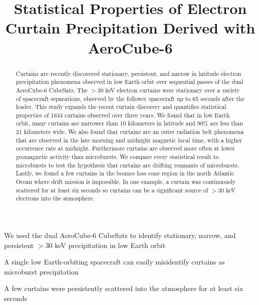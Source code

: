 \documentclass[draft]{agujournal2019}
\begin{document}
\title{Statistical Properties of Electron Curtain Precipitation Derived with AeroCube-6}

%
%






\begin{keypoints}
\item We used the dual AeroCube-6 CubeSats to identify stationary, narrow, and persistent $>30$ keV precipitation in low Earth orbit
\item A single low Earth-orbiting spacecraft can easily misidentify curtains as microburst precipitation
\item A few curtains were persistently scattered into the atmosphere for at least six seconds
\end{keypoints}


\begin{abstract}
Curtains are recently discovered stationary, persistent, and narrow in latitude electron precipitation phenomena observed in low Earth orbit over sequential passes of the dual AeroCube-6 CubeSats. The $> 30$ keV electron curtains were stationary over a variety of spacecraft separations, observed by the follower spacecraft up to 65 seconds after the leader. This study expands the recent curtain discovery and quantifies statistical properties of 1634 curtains observed over three years. We found that in low Earth orbit, many curtains are narrower than 10 kilometers in latitude and 90\% are less than 21 kilometers wide. We also found that curtains are an outer radiation belt phenomena that are observed in the late morning and midnight magnetic local time, with a higher occurrence rate at midnight. Furthermore curtains are observed more often at lower geomagnetic activity than microbursts.  We compare every statistical result to microbursts to test the hypothesis that curtains are drifting remnants of microbursts. Lastly, we found a few curtains in the bounce loss cone region in the north Atlantic Ocean where drift mission is impossible. In one example, a curtain was continuously scattered for at least six seconds so curtains can be a significant source of $> 30$ keV electrons into the atmosphere.
\end{abstract}
\end{document}
